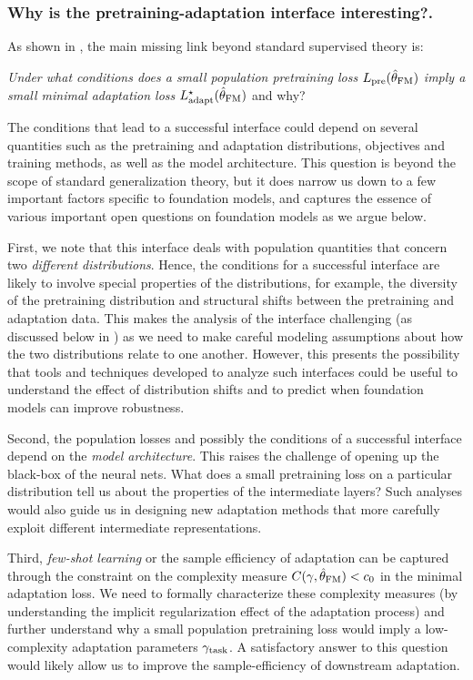 \subsubsection{Why is the pretraining-adaptation interface interesting?.}
\label{sec:theory-interface}
As shown in , the main missing link beyond standard supervised theory is:
\begin{center}
    \emph{Under what conditions does a small population pretraining loss $L_{\text{pre}}(\hat{\theta}_{\textup{FM}})$ imply a small minimal adaptation loss $L_{\text{adapt}}^\star(\hat{\theta}_{\textup{FM}})$} and why?
\end{center}
The conditions that lead to a successful interface could depend on several quantities such as the pretraining and adaptation distributions, objectives and training methods, as well as the model architecture. This question is beyond the scope of standard generalization theory, but it does narrow us down to a few important factors specific to foundation models, and captures the essence of various important open questions on foundation models as we argue below.  

First, we note that this interface deals with population quantities that concern two \emph{different distributions}. Hence, the conditions for a successful interface are likely to involve special properties of the distributions, for example, the diversity of the pretraining distribution and structural shifts between the pretraining and adaptation data. This makes the analysis of the interface challenging (as discussed below in ) as we need to make careful modeling assumptions about how the two distributions relate to one another. However, this presents the possibility that tools and techniques developed to analyze such interfaces could be useful to understand the effect of distribution shifts and to predict when foundation models can improve robustness. 

Second, the population losses and possibly the conditions of a successful interface depend on the \emph{model architecture}. This raises the challenge of opening up the black-box of the neural nets. What does a small pretraining loss on a particular distribution tell us about the properties of the intermediate layers? Such analyses would also guide us in designing new adaptation methods that more carefully exploit different intermediate representations. 

Third, \emph{few-shot learning} or the sample efficiency of adaptation can be captured through the constraint on the complexity measure $C(\gamma, \hat{\theta}_{\textup{FM}}) <c_0$ in the minimal adaptation loss. 
We need to formally characterize these complexity measures (\eg by understanding the implicit regularization effect of the adaptation process) and further understand why a small population pretraining loss would imply a low-complexity adaptation parameters $\gamma_{\text{task}}$. 
A satisfactory answer to this question would likely allow us to improve the sample-efficiency of downstream adaptation.

